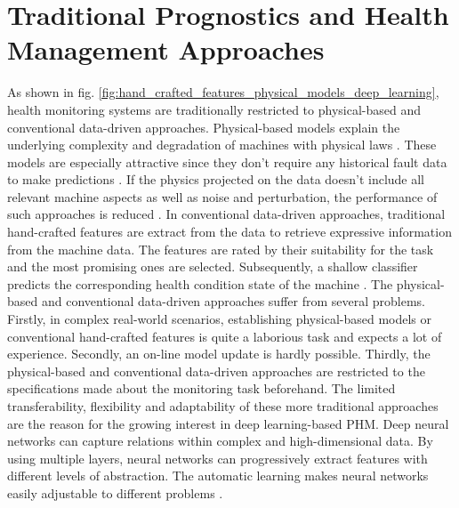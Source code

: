 \section{Traditional Prognostics and Health Management Approaches}
As shown in fig. \ref{fig:hand_crafted_features_physical_models_deep_learning}, health monitoring systems are traditionally restricted to physical-based and conventional data-driven approaches. Physical-based models explain the underlying complexity and degradation of machines with physical laws \cite{ZHAO2019213}. These models are especially attractive since they don't require any historical fault data to make predictions \cite{Benker2019}. If the physics projected on the data doesn't include all relevant machine aspects as well as noise and perturbation, the performance of such approaches is reduced \cite{ZHAO2019213}. In conventional data-driven approaches, traditional hand-crafted features are extract from the data to retrieve expressive information from the machine data. The features are rated by their suitability for the task and the most promising ones are selected. Subsequently, a shallow classifier predicts the corresponding health condition state of the machine \cite{ZHAO2019213}. The physical-based and conventional data-driven approaches suffer from several problems. Firstly, in complex real-world scenarios, establishing physical-based models or conventional hand-crafted features is quite a laborious task and expects a lot of experience. Secondly, an on-line model update is hardly possible. Thirdly, the physical-based and conventional data-driven approaches are restricted to the specifications made about the monitoring task beforehand. The limited transferability, flexibility and adaptability of these more traditional approaches are the reason for the growing interest in deep learning-based PHM. Deep neural networks can capture relations within complex and high-dimensional data. By using multiple layers, neural networks can progressively extract features with different levels of abstraction. The automatic learning makes neural networks easily adjustable to different problems \cite{ZHAO2019213}.
